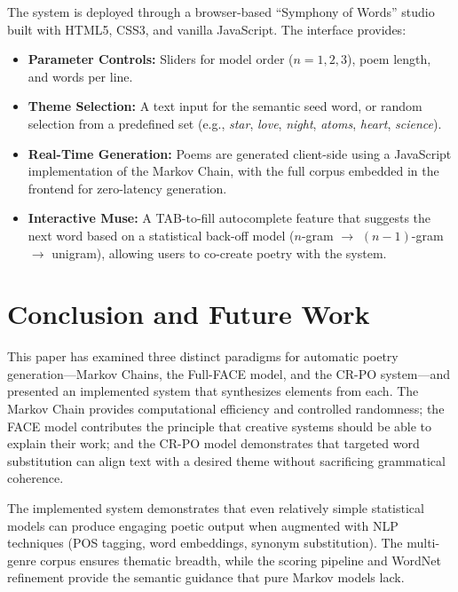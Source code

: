 \documentclass[conference]{IEEEtran}
\begin{document}
The system is deployed through a browser-based ``Symphony of Words'' studio built with HTML5, CSS3, and vanilla JavaScript. The interface provides:

\begin{itemize}
    \item \textbf{Parameter Controls:} Sliders for model order ($n = 1, 2, 3$), poem length, and words per line.
    \item \textbf{Theme Selection:} A text input for the semantic seed word, or random selection from a predefined set (e.g., \textit{star}, \textit{love}, \textit{night}, \textit{atoms}, \textit{heart}, \textit{science}).
    \item \textbf{Real-Time Generation:} Poems are generated client-side using a JavaScript implementation of the Markov Chain, with the full corpus embedded in the frontend for zero-latency generation.
    \item \textbf{Interactive Muse:} A TAB-to-fill autocomplete feature that suggests the next word based on a statistical back-off model ($n$-gram $\to$ $(n{-}1)$-gram $\to$ unigram), allowing users to co-create poetry with the system.
\end{itemize}


\section{Conclusion and Future Work}
\label{sec:conclusion}

This paper has examined three distinct paradigms for automatic poetry generation---Markov Chains, the Full-FACE model, and the CR-PO system---and presented an implemented system that synthesizes elements from each. The Markov Chain provides computational efficiency and controlled randomness; the FACE model contributes the principle that creative systems should be able to explain their work; and the CR-PO model demonstrates that targeted word substitution can align text with a desired theme without sacrificing grammatical coherence.

The implemented system demonstrates that even relatively simple statistical models can produce engaging poetic output when augmented with NLP techniques (POS tagging, word embeddings, synonym substitution). The multi-genre corpus ensures thematic breadth, while the scoring pipeline and WordNet refinement provide the semantic guidance that pure Markov models lack.
\end{document}
